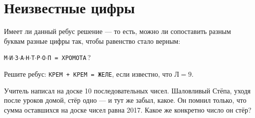 \section{Неизвестные цифры}
\begin{itemize}

\itA Имеет ли данный ребус решение --- то есть, можно ли сопоставить разным буквам разные цифры так, чтобы равенство стало верным:

\centerline{{\tt М$\cdot$И$\cdot$З$\cdot$А$\cdot$Н$\cdot$Т$\cdot$Р$\cdot$О$\cdot$П  = 
ХРОМОТА}\,?}

\itB Решите ребус: {\tt КРЕМ + КРЕМ = ЖЕЛЕ}, если известно, что $\text{Л}=9$.

\itC Учитель написал на доске 10 последовательных чисел. Шаловливый Стёпа, уходя после уроков домой, стёр одно — и тут же забыл, какое. Он помнил только, что сумма оставшихся на доске чисел равна 2017. Какое же конкретно число он стёр?
\end{itemize}